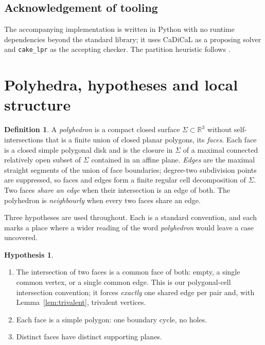 \documentclass[11pt,reqno]{amsart}
\theoremstyle{plain}
\theoremstyle{definition}
\newtheorem{definition}[theorem]{Definition}
\newtheorem{hypothesis}[theorem]{Hypothesis}
\newcommand{\RR}{\mathbb{R}}
\begin{document}
\subsection*{Acknowledgement of tooling}
The accompanying implementation is written in Python with no runtime dependencies beyond the standard
library; it uses CaDiCaL \cite{BiereEtAl2024} as a proposing solver and \texttt{cake\_lpr} \cite{TanHeuleMyreen2023} as the
accepting checker. The partition heuristic follows \cite{BattlemanReevesHeule2025}.

\section{Polyhedra, hypotheses and local structure}\label{sec:polyhedra}

\begin{definition}\label{def:polyhedron}
A \emph{polyhedron} is a compact closed surface $\Sigma\subset\RR^3$ without self-intersections that
is a finite union of closed planar polygons, its \emph{faces}. Each face is a closed simple polygonal
disk and is the closure in $\Sigma$ of a maximal connected relatively open subset of $\Sigma$
contained in an affine plane. \emph{Edges} are the maximal
straight segments of the union of face boundaries; degree-two subdivision points are suppressed, so
faces and edges form a finite regular cell decomposition of $\Sigma$. Two faces \emph{share an edge}
when their intersection is an edge of both. The polyhedron is \emph{neighbourly} when every two faces
share an edge.
\end{definition}

Three hypotheses are used throughout. Each is a standard convention, and each marks a place where a
wider reading of the word \emph{polyhedron} would leave a case uncovered.

\begin{hypothesis}\label{hyp:H}\leavevmode
\begin{enumerate}[label=\textup{(H\arabic*)},leftmargin=3.2em]
\item The intersection of two faces is a common face of both: empty, a single common vertex, or a
   single common edge. This is our polygonal-cell intersection convention; it forces \emph{exactly} one shared
   edge per pair and, with Lemma~\ref{lem:trivalent}, trivalent vertices.
\item Each face is a simple polygon: one boundary cycle, no holes.
\item Distinct faces have distinct supporting planes.
\end{enumerate}
\end{hypothesis}
\end{document}
